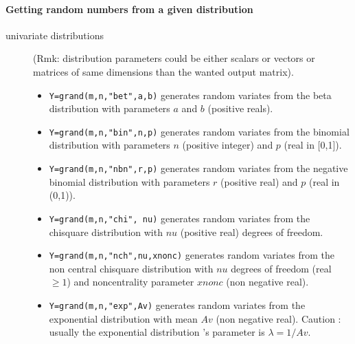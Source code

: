 \paragraph{Getting random numbers from a given distribution}

\begin{description}
\item[univariate distributions] (Rmk: distribution parameters
  could be either scalars or vectors or matrices of same dimensions
  than the wanted output matrix).
  
\begin{itemize}
\item {} \verb!Y=grand(m,n,"bet",a,b)! generates random variates from 
  the beta distribution with parameters $a$ and $b$ (positive reals).

\item {} 
  \verb!Y=grand(m,n,"bin",n,p)!  generates random variates from the binomial 
  distribution with parameters $n$ (positive integer) and $p$
  (real in [0,1]).

\item {} 
  \verb!Y=grand(m,n,"nbn",r,p)! generates random variates from the negative binomial 
  distribution with parameters $r$ (positive real) and $p$ (real 
  in (0,1)).
  
\item {} 
  \verb!Y=grand(m,n,"chi", nu)! generates random variates from the chisquare distribution 
  with $nu$ (positive real) degrees of freedom. 
  
\item {} 
  \verb!Y=grand(m,n,"nch",nu,xnonc)! generates random variates from the non central chisquare
  distribution with $nu$ degrees of freedom (real $\ge 1$) and
  noncentrality parameter $xnonc$ (non negative real).
  
\item {} \verb!Y=grand(m,n,"exp",Av)! generates random variates from the exponential
  distribution with mean $Av$ (non negative real). Caution : usually
  the exponential distribution 's parameter is $\lambda= 1/Av$.  
  

\end{itemize}
\end{description}
